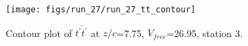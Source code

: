 \begin{figure}[H]
\centering
\texttt{[image: figs/run\_27/run\_27\_tt\_contour]}
\caption{Contour plot of $\overline{t^\prime t^\prime}$ at $z/c$=7.75, $V_{free}$=26.95, station 3.}
\label{fig:run_27_tt_contour}
\end{figure}


